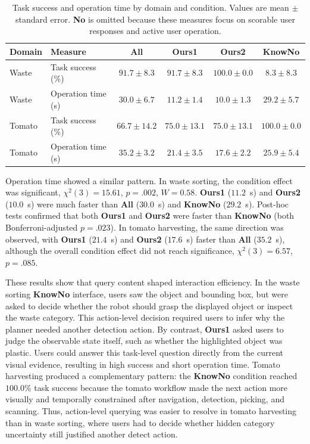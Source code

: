 \begin{table}[t]
\centering
\caption{Task success and operation time by domain and condition. Values are mean $\pm$ standard error. \textbf{No} is omitted because these measures focus on scorable user responses and active user operation.}
\label{tab:user_task_time}
\small
\setlength{\tabcolsep}{5pt}
\begin{tabular*}{\textwidth}{@{\extracolsep{\fill}}llcccc}
\toprule
\textbf{Domain} & \textbf{Measure} & \textbf{All} & \textbf{Ours1} & \textbf{Ours2} & \textbf{KnowNo} \\
\midrule
Waste & Task success (\%) & $91.7 \pm 8.3$ & $91.7 \pm 8.3$ & $100.0 \pm 0.0$ & $8.3 \pm 8.3$ \\
Waste & Operation time (s) & $30.0 \pm 6.7$ & $11.2 \pm 1.4$ & $10.0 \pm 1.3$ & $29.2 \pm 5.7$ \\
Tomato & Task success (\%) & $66.7 \pm 14.2$ & $75.0 \pm 13.1$ & $75.0 \pm 13.1$ & $100.0 \pm 0.0$ \\
Tomato & Operation time (s) & $35.2 \pm 3.2$ & $21.4 \pm 3.5$ & $17.6 \pm 2.2$ & $25.9 \pm 5.4$ \\
\bottomrule
\end{tabular*}
\end{table}

Operation time showed a similar pattern. In waste sorting, the condition effect was significant, $\chi^2(3)=15.61$, $p=.002$, $W=0.58$. \textbf{Ours1} ($11.2$~s) and \textbf{Ours2} ($10.0$~s) were much faster than \textbf{All} ($30.0$~s) and \textbf{KnowNo} ($29.2$~s). Post-hoc tests confirmed that both \textbf{Ours1} and \textbf{Ours2} were faster than \textbf{KnowNo} (both Bonferroni-adjusted $p=.023$). In tomato harvesting, the same direction was observed, with \textbf{Ours1} ($21.4$~s) and \textbf{Ours2} ($17.6$~s) faster than \textbf{All} ($35.2$~s), although the overall condition effect did not reach significance, $\chi^2(3)=6.57$, $p=.085$.

These results show that query content shaped interaction efficiency. In the waste sorting \textbf{KnowNo} interface, users saw the object and bounding box, but were asked to decide whether the robot should grasp the displayed object or inspect the waste category. This action-level decision required users to infer why the planner needed another detection action. By contrast, \textbf{Ours1} asked users to judge the observable state itself, such as whether the highlighted object was plastic. Users could answer this task-level question directly from the current visual evidence, resulting in high success and short operation time. Tomato harvesting produced a complementary pattern: the \textbf{KnowNo} condition reached $100.0\%$ task success because the tomato workflow made the next action more visually and temporally constrained after navigation, detection, picking, and scanning. Thus, action-level querying was easier to resolve in tomato harvesting than in waste sorting, where users had to decide whether hidden category uncertainty still justified another detect action.

